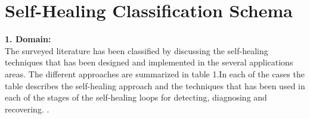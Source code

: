 \chapter{Self-Healing Classification Schema} \label{ch:SelfHealingClassificationSchema}



\textbf{1. Domain:\\}
The surveyed literature has been classified by discussing the self-healing techniques that has been designed and implemented in the several applications areas. The different approaches are summarized in table 1.In each of the cases the table describes the self-healing approach and the techniques that has been used in each of the stages of the self-healing loops for detecting, diagnosing and recovering.
\cite{Harald:SelfHealingSurvey:2011}.\\

